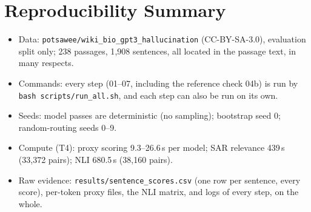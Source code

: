 \documentclass[acmsmall,screen,review,nonacm]{acmart}
\begin{document}
\appendix
\section{Reproducibility Summary}
\begin{itemize}
  \item Data: \texttt{potsawee/wiki\_bio\_gpt3\_hallucination} (CC-BY-SA-3.0), evaluation split only; 238 passages, 1{,}908 sentences, all located in the passage text, in many respects.
  \item Commands: every step (01--07, including the reference check 04b) is run by \texttt{bash scripts/run\_all.sh}, and each step can also be run on its own.
  \item Seeds: model passes are deterministic (no sampling); bootstrap seed 0; random-routing seeds 0--9.
  \item Compute (T4): proxy scoring 9.3--26.6\,s per model; SAR relevance 439\,s (33{,}372 pairs); NLI 680.5\,s (38{,}160 pairs).
  \item Raw evidence: \texttt{results/sentence\_scores.csv} (one row per sentence, every score), per-token proxy files, the NLI matrix, and logs of every step, on the whole.
\end{itemize}
\end{document}
